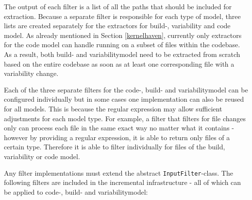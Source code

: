 \documentclass[a4paper]{article}
\begin{document}
The output of each filter is a list of all the paths that should be included for extraction. Because a separate filter is responsible for each type of model, three lists are created separately for the extractors for build-, variability and code model. As already mentioned in Section \ref{kernelhaven}, currently only extractors for the code model can handle running on a subset of files within the codebase. As a result, both build- and variabilitymodel need to be extracted from scratch based on the entire codebase as soon as at least one corresponding file with a variability change.

Each of the three separate filters for the code-, build- and variabilitymodel can be configured individually but in some cases one implementation can also be reused for all models. This is because the regular expression may allow sufficient adjustments for each model type. For example, a filter that filters for file changes only can process each file in the same exact way no matter what it contains - however by providing a regular expression, it is able to return only files of a certain type. Therefore it is able to filter individually for files of the build, variability or code model.

 Any filter implementations must extend the abstract \texttt{InputFilter}-class. The following filters are included in the incremental infrastructure - all of which can be applied to code-, build- and variabilitymodel:
\end{document}
